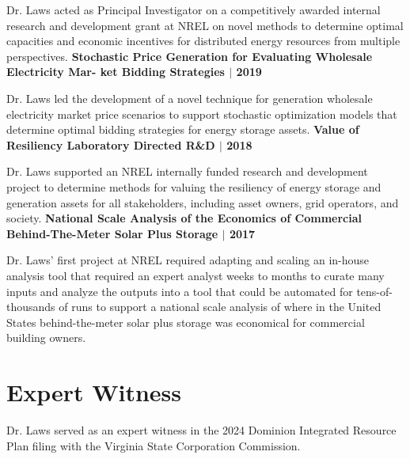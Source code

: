 \documentclass[a4paper,12pt]{report}
\begin{document}
Dr. Laws acted as Principal Investigator on a competitively awarded internal research and
development grant at NREL on novel methods to determine optimal capacities and economic incentives
for distributed energy resources from multiple perspectives.
\newline
\newline
\noindent
\textbf{Stochastic Price Generation for Evaluating Wholesale Electricity Mar-
ket Bidding Strategies $|$ 2019}

Dr. Laws led the development of a novel technique for generation wholesale electricity market price
scenarios to support stochastic optimization models that determine optimal bidding strategies for
energy storage assets.
\newline
\newline
\noindent
\textbf{Value of Resiliency Laboratory Directed R\&D $|$ 2018}

Dr. Laws supported an NREL internally funded research and development project to determine methods for
valuing the resiliency of energy storage and generation assets for all stakeholders, including asset
owners, grid operators, and society.
\newline
\newline
\noindent
\textbf{National Scale Analysis of the Economics of Commercial Behind-The-Meter Solar Plus Storage $|$ 2017}

Dr. Laws' first project at NREL required adapting and scaling an in-house analysis tool that
required an expert analyst weeks to months to curate many inputs and analyze the outputs into a tool
that could be automated for tens-of-thousands of runs to support a national scale analysis of where
in the United States behind-the-meter solar plus storage was economical for commercial building
owners.


\section*{Expert Witness}
Dr. Laws served as an expert witness in the 2024 Dominion Integrated Resource Plan filing with the
Virginia State Corporation Commission.


\end{document}
